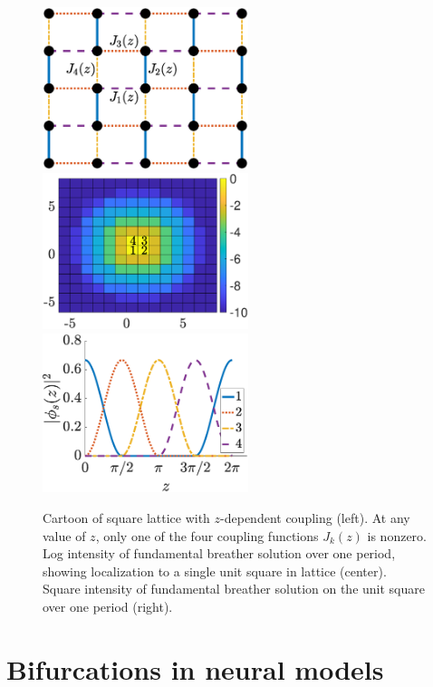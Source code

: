 \documentclass[12pt,reqno,oneside,hidelinks]{article}
\begin{document}
\begin{figure}
    \centering
    \includegraphics[width=6cm]{images/lattice.eps}\hspace{-0.6cm}
    \includegraphics[width=6cm]{images/fundc1map.eps}\hspace{-0.4cm}
    \includegraphics[width=6cm]{images/fundc1sol.eps}
    \caption{Cartoon of square lattice with $z$-dependent coupling (left). At any value of $z$, only one of the four coupling functions $J_k(z)$ is nonzero. Log intensity of fundamental breather solution over one period, showing localization to a single unit square in lattice (center). Square intensity of fundamental breather solution on the unit square over one period (right).}
    \label{fig:Rechtsman}
\end{figure} 

\section*{Bifurcations in neural models}
\end{document}
